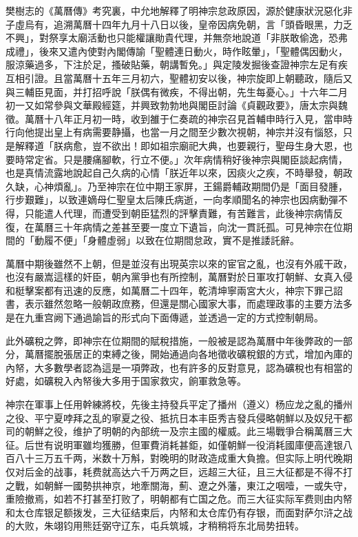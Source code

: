 樊樹志的《萬曆傳》考究裏，中允地解釋了明神宗怠政原因，源於健康狀況惡化非子虛烏有，追溯萬曆十四年九月十八日以後，皇帝因病免朝，言「頭昏眼黑，力乏不興」，對祭享太廟活動也只能權讓勛貴代理，并無奈地說道「非朕敢偷逸，恐弗成禮」，後來又遣內使對內閣傳諭「聖體連日動火，時作眩暈」，「聖體偶因動火，服涼藥過多，下注於足，搔破貼藥，朝講暫免。」與定陵发掘後查證神宗左足有疾互相引證。且當萬曆十五年三月初六，聖體初安以後，神宗旋即上朝聽政，隨后又與三輔臣見面，并打招呼說「朕偶有微疾，不得出朝，先生每憂心。」十六年二月初一又如常參與文華殿經筵，并興致勃勃地與閣臣討論《貞觀政要》，唐太宗與魏徵。萬曆十八年正月初一時，收到雒于仁奏疏的神宗召見首輔申時行入見，當申時行向他提出皇上有病需要静攝，也當一月之間至少數次視朝，神宗并沒有惱怒，只是解釋道「朕病愈，豈不欲出！即如祖宗廟祀大典，也要親行，聖母生身大恩，也要時常定省。只是腰痛腳軟，行立不便。」次年病情稍好後神宗與閣臣談起病情，也是真情流露地說起自己久病的心情「朕近年以來，因痰火之疾，不時舉發，朝政久缺，心神煩亂」。乃至神宗在位中期王家屏，王鍚爵輔政期間仍是「面目發腫，行步艱難」，以致連嫡母仁聖皇太后陳氏病逝，一向孝順聞名的神宗也因病動彈不得，只能遣人代理，而遭受到朝臣猛烈的評擊責難，有苦難言，此後神宗病情反復，在萬曆三十年病情之差甚至要一度立下遺旨，向沈一貫託孤。可見神宗在位期間的「動履不便」「身體虛弱」以致在位期間怠政，實不是推諉託辭。

萬曆中期後雖然不上朝，但是並沒有出現英宗以來的宦官之亂，也沒有外戚干政，也沒有嚴嵩這樣的奸臣，朝內黨爭也有所控制，萬曆對於日軍攻打朝鮮、女真入侵和梃擊案都有迅速的反應，如萬曆二十四年，乾清坤寧兩宮大火，神宗下罪己詔書，表示雖然忽略一般朝政庶務，但還是關心國家大事，而處理政事的主要方法多是在九重宫阙下通過諭旨的形式向下面傳遞，並透過一定的方式控制朝局。

此外礦稅之弊，即神宗在位期間的賦稅措施，一般被是認為萬曆中年後弊政的一部分，萬曆擺脫張居正的束縛之後，開始通過向各地徵收礦稅銀的方式，增加內庫的內帑，大多數學者認為這是一項弊政，也有許多的反對意見，認為礦稅也有相當的好處，如礦稅入內帑後大多用于国家救灾，餉軍救急等。

神宗在軍事上任用幹練將校，先後主持發兵平定了播州（遵义）杨应龙之亂的播州之役、平宁夏哱拜之乱的寧夏之役、抵抗日本丰臣秀吉發兵侵略朝鮮以及奴兒干都司的朝鮮之役，维护了明朝的內部统一及宗主國的權威。此三場戰爭合稱萬曆三大征。后世有说明軍雖均獲勝，但軍費消耗甚鉅，如僅朝鮮一役消耗國庫便高達银八百八十三万五千两，米数十万斛，對晚明的財政造成重大負擔。但实际上明代晚期仅对后金的战事，耗费就高达六千万两之巨，远超三大征，且三大征都是不得不打之戰，如朝鮮一國勢拱神京，地牽關海，薊、遼之外藩，東江之咽噎，一或失守，重險撤焉，如若不打甚至打败了，明朝都有亡国之危。而三大征实际军费则由内帑和太仓库银足额拨发，三大征结束后，内帑和太仓库仍有存银，而面對萨尔浒之战的大败，朱翊钧用熊廷弼守辽东，屯兵筑城，才稍稍将东北局势扭转。

